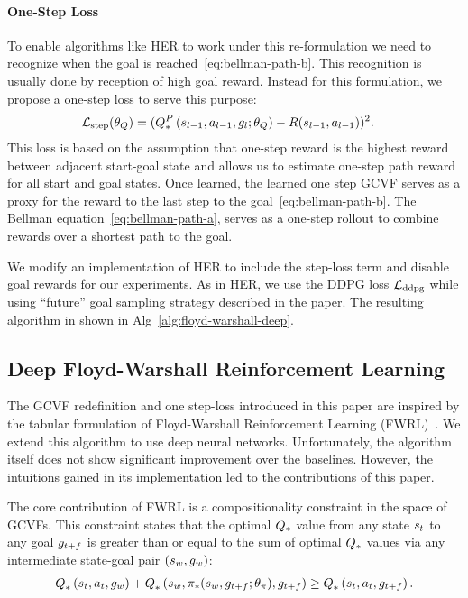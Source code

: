 \paragraph{One-Step Loss}
To enable algorithms like HER to work under this re-formulation we need to
recognize when the goal is reached~\eqref{eq:bellman-path-b}. This recognition
is usually done by reception of high goal reward. Instead for this formulation,
we propose a one-step loss to serve this purpose:
%
\begin{align}
      \LossStep(\param_\fw) &= (\fwargs{\state_{l-1}}{\act_{l-1}}{\goal_{l};\param_\fw}{*}{P} - \Rew(\state_{l-1}, \act_{l-1}))^2.
\end{align}%
%
This loss is based on the assumption that one-step reward is the highest reward
between adjacent start-goal state and allows us to estimate one-step path reward
for all start and goal states. Once learned, the learned one step GCVF serves as
a proxy for the reward to the last step to the goal~\eqref{eq:bellman-path-b}.
The Bellman equation~\eqref{eq:bellman-path-a}, serves as a one-step rollout
to combine rewards over a shortest path to the goal.


We modify an implementation of HER to include the step-loss term and disable goal
rewards for our experiments.
As in HER, we use the DDPG loss $\LossDDPG$ while
using ``future'' goal sampling strategy described in the paper.
The resulting algorithm in shown in Alg~\ref{alg:floyd-warshall-deep}.


\subsection{Deep Floyd-Warshall Reinforcement Learning}

The GCVF redefinition and one step-loss introduced in this paper are inspired by
the tabular formulation of Floyd-Warshall
Reinforcement Learning (FWRL)~\citep{dhiman2018floydwarshall}.
We extend this algorithm to use deep neural networks.
Unfortunately, the algorithm itself does not show significant improvement over
the baselines. However, the intuitions gained in its implementation led to
the contributions of this paper. 

The core contribution of FWRL is a compositionality constraint in the space
of GCVFs. 
This constraint states that the optimal $\Q_*$ value 
from any state $\state_t$ to any goal $\goal_{t+f}$ is greater than or equal to
the sum of optimal $\Q_*$ values via any intermediate state-goal pair $(\state_{w}, \goal_{w})$:
%
\begin{align}
      \fwargs{\state_{t}}{\act_t}{\goal_{w}}{*}{}
      + \fwargs{\state_{w}}{\policy_*(\state_{w}, \goal_{t+f};\param_\policy)}{\goal_{t+f}}{*}{}
      \ge \fwargs{\state_{t}}{\act_t}{\goal_{t+f}}{*}{}.
\end{align}%
% 

